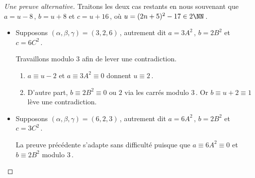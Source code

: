 \begin{proof}[Une preuve alternative]
	Traitons les deux cas restants en nous souvenant que $a = u - 8$\,, $b = u + 8$ et $c = u + 16$\,, où $u = (2 n + 5)^2 - 17 \in 2 \NN$\,.
	
	\begin{itemize}
		\item Supposons $(\alpha, \beta, \gamma) = (3, 2, 6)$\,, 
		autrement dit 
		$a = 3 A^2$\,, $b = 2 B^2$ et $c = 6 C^2$\,.
		
		\smallskip
		\noindent
		Travaillons modulo $3$ afin de lever une contradiction.
		\begin{enumerate}			
			\item $a \equiv u - 2$ et $a \equiv 3 A^2 \equiv 0$ donnent $u \equiv 2$\,.
			
			\item D'autre part, $b \equiv 2 B^2 \equiv \text{$0$ ou $2$}$ via les carrés modulo $3$\,.
			Or $b \equiv u + 2 \equiv 1$ lève une contradiction.
		\end{enumerate}
		
		
		\item Supposons $(\alpha, \beta, \gamma) = (6, 2, 3)$\,, 
		autrement dit 
		$a = 6 A^2$\,, $b = 2 B^2$ et $c = 3 C^2$\,.
		
		\smallskip
		\noindent
		La preuve précédente s'adapte sans difficulté puisque que $a \equiv 6 A^2 \equiv 0$ et $b \equiv 2 B^2$ modulo $3$\,.
	\end{itemize}
\end{proof}

